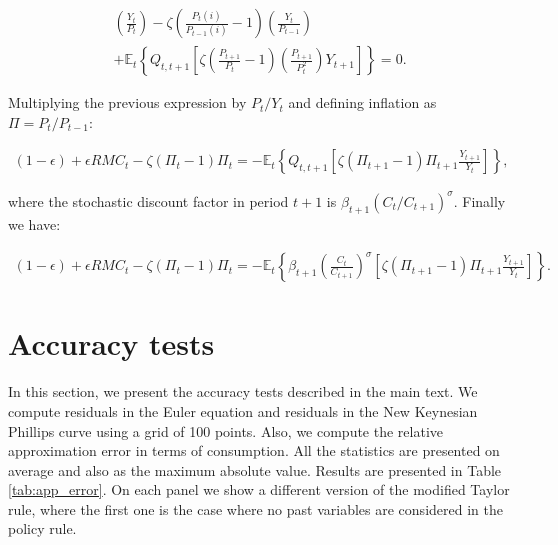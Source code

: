 \documentclass[11pt]{article}
\numberwithin{equation}{section}
\begin{document}
\begin{align*}
[(1-\epsilon)+\epsilon RMC_t]\left(\frac{Y_t}{P_t}\right)-\zeta\left(\frac{P_t(i)}{P_{t-1}(i)}-1\right)\left(\frac{Y_t}{P_{t-1}}\right)\\
+\mathbb{E}_t\left\{Q_{t,t+1}\left[\zeta\left(\frac{P_{t+1}}{P_t}-1\right)\left(\frac{P_{t+1}}{P_t^2}\right)Y_{t+1}\right]\right\}=0.
\end{align*}

Multiplying the previous expression by $P_t/Y_t$ and defining inflation as $\Pi=P_t/P_{t-1}$:

\begin{align*}
(1-\epsilon)+\epsilon RMC_t-\zeta(\Pi_t-1)\Pi_t=-\mathbb{E}_t\left\{Q_{t,t+1}\left[\zeta(\Pi_{t+1}-1)\Pi_{t+1}\frac{Y_{t+1}}{Y_t}\right]\right\},
\end{align*}

\noindent where the stochastic discount factor in period $t+1$ is $\beta_{t+1}(C_t/C_{t+1})^{\sigma}$. Finally we have:

\begin{align*}
(1-\epsilon)+\epsilon RMC_t-\zeta(\Pi_t-1)\Pi_t=-\mathbb{E}_t\left\{\beta_{t+1}\left(\frac{C_t}{C_{t+1}}\right)^{\sigma}\left[\zeta(\Pi_{t+1}-1)\Pi_{t+1}\frac{Y_{t+1}}{Y_t}\right]\right\}.
\end{align*}

\section{Accuracy tests}\label{app:accuracy}
	
In this section, we present the accuracy tests described in the main text. We compute residuals in the Euler equation and residuals in the New Keynesian Phillips curve using a grid of 100 points. Also, we compute the relative approximation error in terms of consumption. All the statistics are presented on average and also as the maximum absolute value. Results are presented in Table \ref{tab:app_error}. On each panel we show a different version of the modified Taylor rule, where the first one is the case where no past variables are considered in the policy rule.


	
\end{document}
